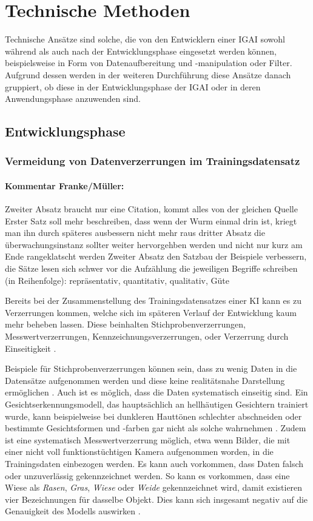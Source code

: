 \documentclass[12pt]{article}
\begin{document}
\section{Technische Methoden}

Technische Ansätze sind solche, die von den Entwicklern einer IGAI sowohl während als auch nach der Entwicklungsphase eingesetzt werden können, beispielsweise in Form von Datenaufbereitung und -manipulation oder Filter. 
Aufgrund dessen werden in der weiteren Durchführung diese Ansätze danach gruppiert, ob diese in der Entwicklungsphase der IGAI oder in deren Anwendungsphase anzuwenden sind.

\subsection{Entwicklungsphase}
\subsubsection{Vermeidung von Datenverzerrungen im Trainingsdatensatz}


\paragraph{Kommentar Franke/Müller:}
Zweiter Absatz braucht nur eine Citation, kommt alles von der gleichen Quelle
Erster Satz soll mehr beschreiben, dass wenn der Wurm einmal drin ist, kriegt man ihn durch späteres ausbessern nicht mehr raus
dritter Absatz die überwachungsinstanz sollter weiter hervorgehben werden und nicht nur kurz am Ende rangeklatscht werden
Zweiter Absatz den Satzbau der Beispiele verbessern, die Sätze lesen sich schwer
vor die Aufzählung die jeweiligen Begriffe schreiben (in Reihenfolge): repräsentativ, quantitativ, qualitativ, Güte


Bereits bei der Zusammenstellung des Trainingsdatensatzes einer KI kann es zu Verzerrungen kommen, welche sich im späteren Verlauf der Entwicklung kaum mehr beheben lassen.
Diese beinhalten Stichprobenverzerrungen, Messwertverzerrungen, Kennzeichnungsverzerrungen, oder Verzerrung durch Einseitigkeit \cite{Srinivasan}.

Beispiele für Stichprobenverzerrungen können sein, dass zu wenig Daten in die Datensätze aufgenommen werden und diese keine realitätsnahe Darstellung ermöglichen \cite{Srinivasan}.
Auch ist es möglich, dass die Daten systematisch einseitig sind. Ein Gesichtserkennungsmodell, das hauptsächlich an hellhäutigen Gesichtern trainiert wurde, kann beispielweise bei dunkleren Hauttönen schlechter abschneiden oder bestimmte Gesichtsformen und -farben gar nicht als solche wahrnehmen \cite{Srinivasan}.
Zudem ist eine systematisch Messwertverzerrung möglich, etwa wenn Bilder, die mit einer nicht voll funktionstüchtigen Kamera aufgenommen worden, in die Trainingsdaten einbezogen werden.
Es kann auch vorkommen, dass Daten falsch oder unzuverlässig gekennzeichnet werden. So kann es vorkommen, dass eine Wiese als \textit{Rasen}, \textit{Gras}, \textit{Wiese} oder \textit{Weide} gekennzeichnet wird, damit existieren vier Bezeichnungen für dasselbe Objekt. Dies kann sich insgesamt negativ auf die Genauigkeit des Modells auswirken \cite{Srinivasan}.
\end{document}
